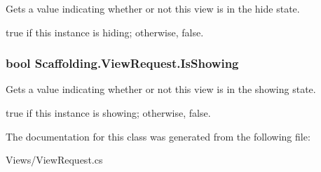Gets a value indicating whether or not this view is in the hide state. 

{\ttfamily true} if this instance is hiding; otherwise, {\ttfamily false}.\hypertarget{class_scaffolding_1_1_view_request_a56767533f14295a74852fdb2f855504f}{
\subsubsection[{Is\+Showing}]{\setlength{\rightskip}{0pt plus 5cm}bool Scaffolding.\+View\+Request.\+Is\+Showing\hspace{0.3cm}{\ttfamily [get]}}}\label{class_scaffolding_1_1_view_request_a56767533f14295a74852fdb2f855504f}


Gets a value indicating whether or not this view is in the showing state. 

{\ttfamily true} if this instance is showing; otherwise, {\ttfamily false}.

The documentation for this class was generated from the following file\+:\begin{DoxyCompactItemize}
\item 
Views/View\+Request.\+cs\end{DoxyCompactItemize}
